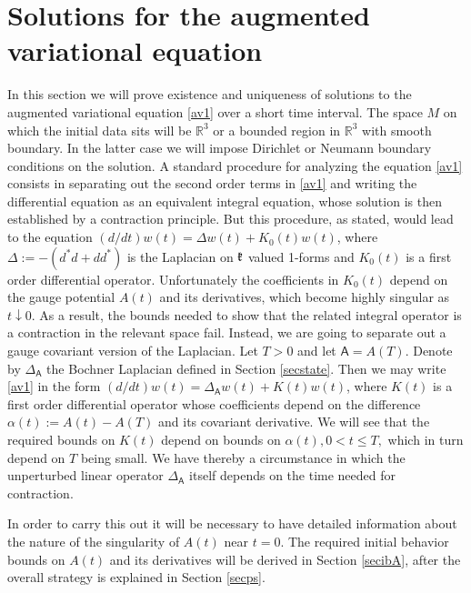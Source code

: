 \documentclass[12pt]{article}
\def \R{\mathbb R}
\def \As{\mathsf{A}}
\def \kf{\frak k}
\def \eref{\eqref}
\numberwithin{equation}{section}
\begin{document}
\section{Solutions for the augmented variational equation }\label{secEUaug}

     In this section we will prove existence and uniqueness of solutions to the augmented
variational equation \eref{av1} over a short time interval. The space $M$ on which the initial data sits
will be $\R^3$ or a bounded region in $\R^3$ with smooth boundary. In the latter case we will impose
Dirichlet or Neumann boundary conditions on the solution. 
A standard procedure for analyzing the equation \eref{av1} consists in  separating
  out the second order terms in \eref{av1} and writing the differential
 equation  as an equivalent integral equation, whose solution is  then established by a contraction principle.
 But this procedure, as stated, would lead to the equation $(d/dt)w(t) = \Delta w(t) + K_0(t) w(t)$,
  where $\Delta := -(d^*d + dd^*)$  is the Laplacian on $\kf$ valued 1-forms and $K_0(t)$ is a 
  first order differential operator.
 Unfortunately the coefficients in $K_0(t)$ depend on the         
  gauge potential $A(t) $ and its derivatives, which become highly singular as $t\downarrow 0$.
  As a result, the bounds needed to show that the related integral
  operator is a contraction in the relevant space fail.   Instead, we are going to separate
   out a gauge covariant   version of the Laplacian. Let $T >0$ and let $\As = A(T)$. Denote by
   $\Delta_\As$ the Bochner Laplacian defined in Section \ref{secstate}. Then we may write \eref{av1}
   in the form  $(d/dt)w(t) = \Delta_\As w(t) + K(t) w(t)$, where $K(t)$ is a first order differential operator
   whose coefficients  depend on the difference $\alpha(t) := A(t) - A(T)$ and its covariant derivative.
   We will see that the required bounds on $K(t)$ depend on bounds on $\alpha(t), 0 < t \le T,$ which in 
   turn depend on $T$ being small. We have thereby a circumstance in which the unperturbed linear
   operator   $\Delta_\As$ itself depends on the time needed for contraction.
   
  
  In order to carry this out it will
  be necessary to have detailed information about the nature of the singularity of $A(t)$ near $t =0$.
  The required initial behavior bounds on $A(t)$ and its derivatives will be derived in Section 
  \ref{secibA}, after the overall strategy is explained  in Section \ref{secps}. 
\end{document}
